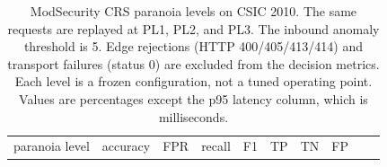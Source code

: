 \documentclass[preprint,11pt]{elsarticle}
\begin{document}
{
\begingroup\fontsize{7}{8.4}\selectfont\setlength{\tabcolsep}{2pt}
\begin{longtable}[]{@{}
  >{\raggedleft\arraybackslash}p{}
  >{\raggedleft\arraybackslash}p{}
  >{\raggedleft\arraybackslash}p{}
  >{\raggedleft\arraybackslash}p{}
  >{\raggedleft\arraybackslash}p{}
  >{\raggedleft\arraybackslash}p{}
  >{\raggedleft\arraybackslash}p{}
  >{\raggedleft\arraybackslash}p{}
  >{\raggedleft\arraybackslash}p{}
  >{\raggedleft\arraybackslash}p{}@{}}
\caption{ModSecurity CRS paranoia levels on CSIC 2010. The same
requests are replayed at PL1, PL2, and PL3. The inbound anomaly
threshold is 5. Edge rejections (HTTP 400/405/413/414) and transport
failures (status 0) are excluded from the decision metrics. Each level
is a frozen configuration, not a tuned operating point. Values are
percentages except the p95 latency column, which is milliseconds.}\label{tab:crs}\\
\toprule\noalign{}
\begin{minipage}[t]{\linewidth}\raggedleft
paranoia level
\end{minipage} & \begin{minipage}[t]{\linewidth}\raggedleft
accuracy
\end{minipage} & \begin{minipage}[t]{\linewidth}\raggedleft
FPR
\end{minipage} & \begin{minipage}[t]{\linewidth}\raggedleft
recall
\end{minipage} & \begin{minipage}[t]{\linewidth}\raggedleft
F1
\end{minipage} & \begin{minipage}[t]{\linewidth}\raggedleft
TP
\end{minipage} & \begin{minipage}[t]{\linewidth}\raggedleft
TN
\end{minipage} & \begin{minipage}[t]{\linewidth}\raggedleft
FP
\end{minipage} & \begin{minipage}[t]{\linewidth}\raggedleft

\end{minipage}
\end{longtable}}
\end{document}
